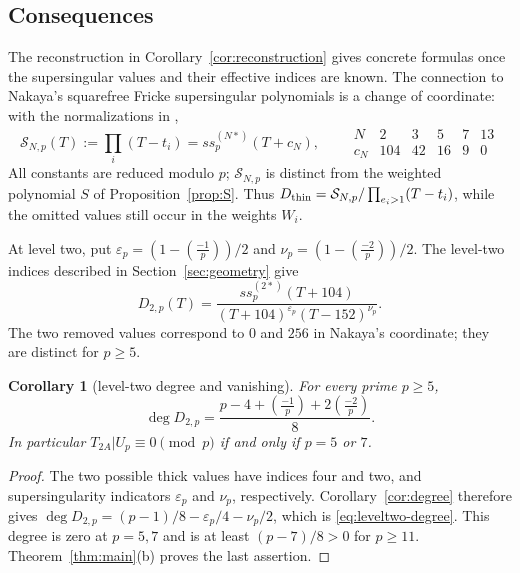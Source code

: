 \documentclass[11pt,a4paper]{article}
\numberwithin{equation}{section}
\newtheorem{corollary}[theorem]{Corollary}
\theoremstyle{definition}
\theoremstyle{remark}
\begin{document}
\subsection{Consequences}\label{subsec:consequences}
The reconstruction in Corollary~\ref{cor:reconstruction} gives concrete formulas
once the supersingular values and their effective indices are known.
The connection to Nakaya's squarefree Fricke supersingular polynomials is a
change of coordinate: with the normalizations in \citet[\S4]{Nakaya19},
\begin{equation}\label{eq:nakaya-coordinate}
\mathcal S_{N,p}(T):=\prod_i(T-t_i)=ss_p^{(N*)}(T+c_N),\qquad
\begin{array}{c|rrrrr}
N&2&3&5&7&13\\\hline
c_N&104&42&16&9&0
\end{array}
\end{equation}
All constants are reduced modulo $p$; $\mathcal S_{N,p}$ is distinct from the
weighted polynomial $S$ of Proposition~\ref{prop:S}. Thus
$D_{\rm thin}=\mathcal S_{N,p}/\prod_{e_i>1}(T-t_i)$, while the omitted
values still occur in the weights $W_i$.

At level two, put
$\varepsilon_p=(1-\left(\frac{-1}{p}\right))/2$ and
$\nu_p=(1-\left(\frac{-2}{p}\right))/2$.
The level-two indices described in Section~\ref{sec:geometry} give
\begin{equation}\label{eq:leveltwo-denominator}
D_{2,p}(T)=\frac{ss_p^{(2*)}(T+104)}
{(T+104)^{\varepsilon_p}(T-152)^{\nu_p}}.
\end{equation}
The two removed values correspond to $0$ and $256$ in Nakaya's coordinate;
they are distinct for $p\ge5$.

\begin{corollary}[level-two degree and vanishing]\label{cor:leveltwo-vanishing}
For every prime $p\ge5$,
\begin{equation}\label{eq:leveltwo-degree}
\deg D_{2,p}=\frac{p-4+\left(\frac{-1}{p}\right)+2\left(\frac{-2}{p}\right)}8.
\end{equation}
In particular $T_{2A}|U_p\equiv0\pmod p$ if and only if $p=5$ or $7$.
\end{corollary}
\begin{proof}
The two possible thick values have indices four and two, and supersingularity
indicators $\varepsilon_p$ and $\nu_p$, respectively. Corollary~\ref{cor:degree}
therefore gives
$\deg D_{2,p}=(p-1)/8-\varepsilon_p/4-\nu_p/2$, which is
\eqref{eq:leveltwo-degree}. This degree is zero at $p=5,7$ and is at least
$(p-7)/8>0$ for $p\ge11$. Theorem~\ref{thm:main}(b) proves the last assertion.
\end{proof}
\end{document}
